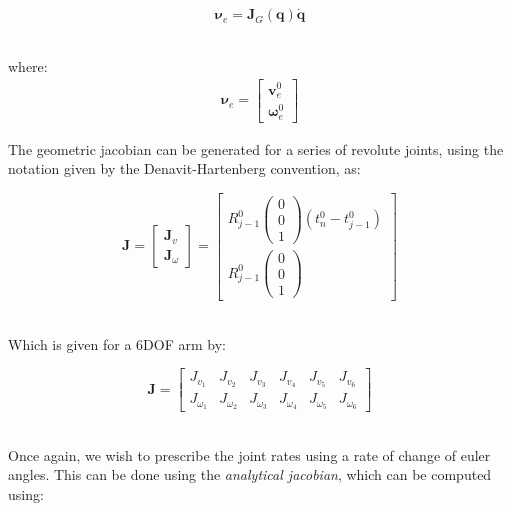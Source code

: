 \documentclass{UoNMCHA}
\numberwithin{equation}{section}
\begin{document}
\begin{equation*}
	\mathbf{\nu}_e = \mathbf{J}_{G} (\mathbf{q}) \dot{\mathbf{q}}
\end{equation*}\

where:
\begin{equation}
	\begin{aligned}
		\mathbf{\nu}_e  = 
		\begin{bmatrix}
			\mathrm{\mathbf{v}}^{0}_{e} \\ \mathbf{\omega}^{0}_{e}
		\end{bmatrix}
	\end{aligned}	
\end{equation}

The geometric jacobian can be generated for a series of revolute joints, using the notation given by the Denavit-Hartenberg convention, as:

\begin{equation}
	\mathbf{J} =
	\begin{bmatrix}
	\mathbf{J}_{v} \\ \mathbf{J}_{\omega}  
	\end{bmatrix} = 
	\begin{bmatrix}
	R^{0}_{j-1} \begin{pmatrix}
	0 \\0\\1 
	\end{pmatrix}(t^0_n - t^0_{j-1})\\
	 R^{0}_{j-1}
	 \begin{pmatrix}
	 0 \\0\\1 
	 \end{pmatrix}  
	\end{bmatrix}
\end{equation}\

Which is given for a 6DOF arm by:

\begin{equation*}
\mathbf{J} =
\begin{bmatrix}
J_{v_1} & J_{v_2} & J_{v_3} & J_{v_4} & J_{v_5} & J_{v_6}  \\
 J_{\omega_1} & J_{\omega_2} & J_{\omega_3} & J_{\omega_4} & J_{\omega_5} & J_{\omega_6}  
\end{bmatrix}
\end{equation*}\

Once again, we wish to prescribe the joint rates using a rate of change of euler angles. This can be done using the \textit{analytical jacobian}, which can be computed using:
\end{document}
